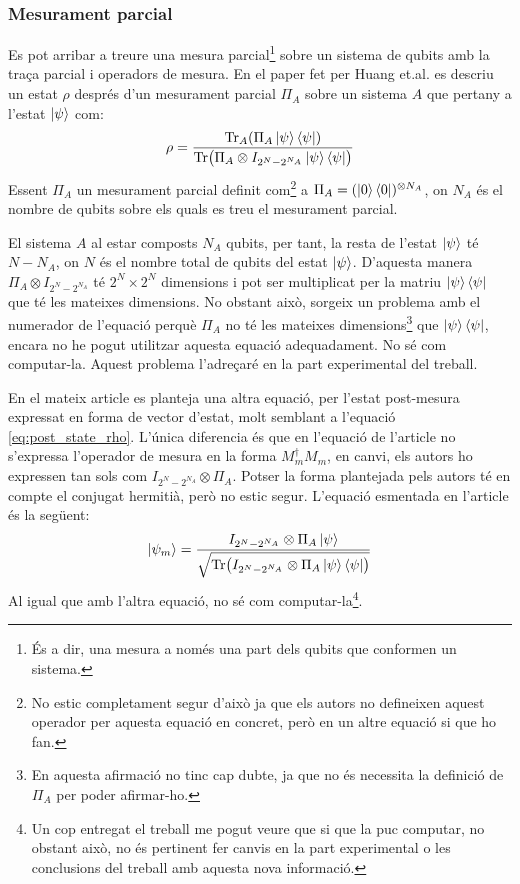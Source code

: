 \subsubsection{Mesurament parcial}
\label{par_measurament}
Es pot arribar a treure una mesura parcial\footnote{És a dir, una mesura a només una part dels qubits que conformen un sistema.} sobre un sistema de qubits amb la traça parcial i operadors de mesura. En el paper fet per Huang et.al. \cite{QGAN_exp} es descriu un estat $\rho$ després d'un mesurament parcial $\Pi_A$ sobre un sistema $A$ que pertany a l'estat $\ket{\psi}$ com:
$$
\rho = \frac{\Tr_A(\Pi_A \ket{\psi}\bra{\psi})}{\Tr(\Pi_A\otimes I_{2^N-2^{N_A}}\ket{\psi}\bra{\psi})}
$$
Essent $\Pi_{A}$ un mesurament parcial definit com\footnote{No estic completament segur d'això ja que els autors no defineixen aquest operador per aquesta equació en concret, però en un altre equació si que ho fan.} a $\Pi_{A}=(\ket{0}\bra{0})^{\otimes N_{A}}$, on $N_{A}$ és el nombre de qubits sobre els quals es treu el mesurament parcial.

El sistema $A$ al estar composts $N_A$ qubits, per tant, la resta de l'estat $\ket{\psi}$ té $N-N_A$, on $N$ és el nombre total de qubits del estat $\ket{\psi}$. D'aquesta manera $\Pi_A\otimes I_{2^N-2^{N_A}}$ té $2^N\times 2^N$ dimensions i pot ser multiplicat per la matriu $\ket{\psi}\bra{\psi}$ que té les mateixes dimensions. No obstant això, sorgeix un problema amb el numerador de l'equació perquè $\Pi_A$ no té les mateixes dimensions\footnote{En aquesta afirmació no tinc cap dubte, ja que no és necessita la definició de $\Pi_{A}$ per poder afirmar-ho.} que $\ket{\psi}\bra{\psi}$, encara no he pogut utilitzar aquesta equació adequadament. No sé com computar-la. Aquest problema l'adreçaré en la part experimental del treball.

En el mateix article es planteja una altra equació, per l'estat post-mesura expressat en forma de vector d'estat, molt semblant a l'equació \ref{eq:post_state_rho}. L'única diferencia és que en l'equació de l'article no s'expressa l'operador de mesura en la forma $M_m^\dagger M_m$, en canvi, els autors ho expressen tan sols com $I_{2^N-2^{N_A}}\otimes \Pi_A$. Potser la forma plantejada pels autors té en compte el conjugat hermitià, però no estic segur.
L'equació esmentada en l'article és la següent:
$$
\ket{\psi_m} = \frac{I_{2^N-2^{N_A}}\otimes\Pi_A\ket{\psi}}{\sqrt{\Tr(I_{2^N-2^{N_A}}\otimes\Pi_A\ket{\psi}\bra{\psi})}}
$$
Al igual que amb l'altra equació, no sé com computar-la\footnote{Un cop entregat el treball me pogut veure que si que la puc computar, no obstant això, no és pertinent fer canvis en la part experimental o les conclusions del treball amb aquesta nova informació. }.

